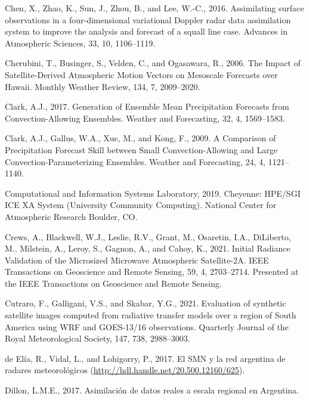 \documentclass[12pt,oneside]{reedthesis}
\begin{document}
\leavevmode\hypertarget{ref-chen2016}{}%
Chen, X., Zhao, K., Sun, J., Zhou, B., and Lee, W.-C., 2016. Assimilating surface observations in a four-dimensional variational Doppler radar data assimilation system to improve the analysis and forecast of a squall line case. Advances in Atmospheric Sciences, 33, 10, 1106--1119.

\leavevmode\hypertarget{ref-cherubini2006}{}%
Cherubini, T., Businger, S., Velden, C., and Ogasawara, R., 2006. The Impact of Satellite-Derived Atmospheric Motion Vectors on Mesoscale Forecasts over Hawaii. Monthly Weather Review, 134, 7, 2009--2020.

\leavevmode\hypertarget{ref-clark2017}{}%
Clark, A.J., 2017. Generation of Ensemble Mean Precipitation Forecasts from Convection-Allowing Ensembles. Weather and Forecasting, 32, 4, 1569--1583.

\leavevmode\hypertarget{ref-clark2009}{}%
Clark, A.J., Gallus, W.A., Xue, M., and Kong, F., 2009. A Comparison of Precipitation Forecast Skill between Small Convection-Allowing and Large Convection-Parameterizing Ensembles. Weather and Forecasting, 24, 4, 1121--1140.

\leavevmode\hypertarget{ref-Cheyenne2019}{}%
Computational and Information Systems Laboratory, 2019. Cheyenne: HPE/SGI ICE XA System (University Community Computing). National Center for Atmospheric Research Boulder, CO.

\leavevmode\hypertarget{ref-crews2021}{}%
Crews, A., Blackwell, W.J., Leslie, R.V., Grant, M., Osaretin, I.A., DiLiberto, M., Milstein, A., Leroy, S., Gagnon, A., and Cahoy, K., 2021. Initial Radiance Validation of the Microsized Microwave Atmospheric Satellite-2A. IEEE Transactions on Geoscience and Remote Sensing, 59, 4, 2703--2714. Presented at the IEEE Transactions on Geoscience and Remote Sensing.

\leavevmode\hypertarget{ref-cutraro2021}{}%
Cutraro, F., Galligani, V.S., and Skabar, Y.G., 2021. Evaluation of synthetic satellite images computed from radiative transfer models over a region of South America using WRF and GOES-13/16 observations. Quarterly Journal of the Royal Meteorological Society, 147, 738, 2988--3003.

\leavevmode\hypertarget{ref-deelia2017}{}%
de Elía, R., Vidal, L., and Lohigorry, P., 2017. El SMN y la red argentina de radares meteorológicos (\url{http://hdl.handle.net/20.500.12160/625}).

\leavevmode\hypertarget{ref-dillon2017}{}%
Dillon, L.M.E., 2017. Asimilación de datos reales a escala regional en Argentina.
\end{document}
